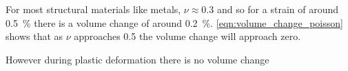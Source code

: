 For most structural materials like metals, $\nu \approx 0.3$ and so for a strain of around \SI{0.5}{\percent} there is a volume change of around \SI{0.2}{\percent}. \autoref{eqn:volume_change_poisson} shows that as $\nu$ approaches 0.5 the volume change will approach zero.
 
However during plastic deformation there is no volume change